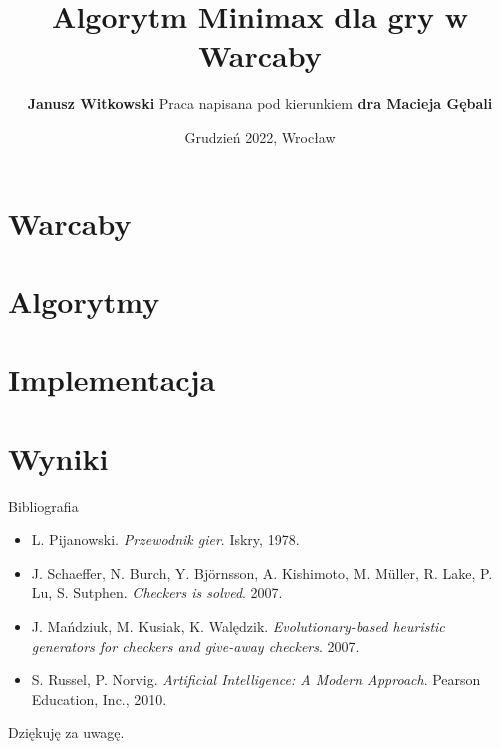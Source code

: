 \documentclass{beamer}
\title{Algorytm Minimax dla gry w Warcaby}
\author{
	\textbf{Janusz Witkowski}
	\newline \newline
	Praca napisana pod kierunkiem \textbf{dra Macieja Gębali}
}
\date{Grudzień 2022, Wrocław}
\newcommand{\myitem}{\item[$\vartriangleright$]}
\begin{document}
\begin{frame}[plain]{}
	\titlepage
\end{frame}


\section{Warcaby}

\section{Algorytmy}

\section{Implementacja}


% 
% 
% 

\section{Wyniki}



% 

% 
% 
% 

\begin{frame}[plain]{Bibliografia}
	\begin{center}
		\begin{itemize}
			\myitem L. Pijanowski. \textit{Przewodnik gier}. Iskry, 1978.
			\myitem J. Schaeffer, N. Burch, Y. Björnsson, A. Kishimoto, M. Müller, R. Lake, P. Lu, S. Sutphen. \textit{Checkers is solved}. 2007.
			\myitem J. Mańdziuk, M. Kusiak, K. Walędzik. \textit{Evolutionary-based heuristic generators for checkers and give-away checkers}. 2007.
			\myitem S. Russel, P. Norvig. \textit{Artificial Intelligence: A Modern Approach}. Pearson Education, Inc., 2010.
		\end{itemize}
	\end{center}
\end{frame}

\begin{frame}[plain]{}
	\begin{center}
		\large{Dziękuję za uwagę.}
	\end{center}
\end{frame}


\end{document}
